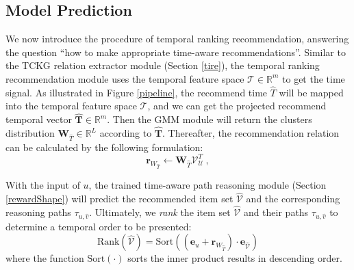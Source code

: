 \subsection{Model Prediction}
We now introduce the procedure of temporal ranking recommendation, answering the question ``how to make appropriate time-aware recommendations''.
Similar to the TCKG relation extractor module (Section \ref{tire}), the temporal ranking recommendation module uses the temporal feature space $\mathcal{T} \in \mathbb{R}^m$ to get the time signal.
As illustrated in Figure \ref{pipeline}, the recommend time $\hat{T}$ will be mapped into the temporal feature space $\mathcal{T}$, and we can get the projected recommend temporal vector $\boldsymbol{\hat{T}} \in \mathbb{R}^m$. Then the GMM module will return the clusters distribution $\boldsymbol{W}_{\hat{T}} \in \mathbb{R}^L$ according to $\boldsymbol{\hat{T}}$. Thereafter, the recommendation relation can be calculated by the following formulation:
\begin{equation}\label{rankeq}
\boldsymbol{r}_{W_{\hat{T}}} \leftarrow \boldsymbol{W}_{\hat{T}}\mathcal{V}_\mathcal{U}^T \ ,
\end{equation}

With the input of $u$, the trained time-aware path reasoning module (Section \ref{rewardShape}) will predict the recommended item set $\hat{\mathcal{V}}$ and the corresponding reasoning paths $\tau_{u, \hat{v}}$. Ultimately, we  \textit{rank} the item set $\hat{\mathcal{V}}$ and their paths $\tau_{u, \hat{v}}$ to determine a temporal order to be presented:
\begin{equation}
\text{Rank}(\hat{\mathcal{V}}) = \text{Sort}((\boldsymbol{e}_u + \boldsymbol{r}_{W_{\hat{T}}}) \cdot \boldsymbol{e}_{\hat{\mathcal{V}}})
\end{equation}
where the function $\text{Sort}(\cdot)$ sorts the inner product results in descending order.




